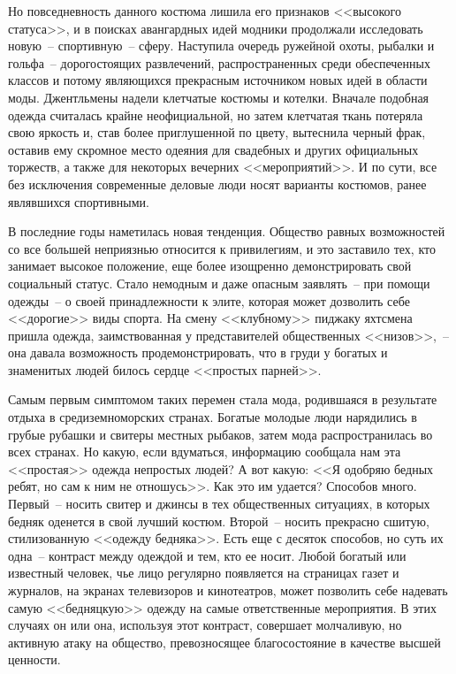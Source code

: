   Но повседневность данного костюма лишила его признаков <<высокого статуса>>,
  и в поисках авангардных идей модники продолжали исследовать новую~--
  спортивную~-- сферу. Наступила очередь ружейной охоты, рыбалки и гольфа~--
  дорогостоящих развлечений, распространенных среди обеспеченных классов и
  потому являющихся прекрасным источником новых идей в области моды.
  Джентльмены надели клетчатые костюмы и котелки. Вначале подобная одежда
  считалась крайне неофициальной, но затем клетчатая ткань потеряла свою
  яркость и, став более приглушенной по цвету, вытеснила черный фрак, оставив
  ему скромное место одеяния для свадебных и других официальных торжеств, а
  также для некоторых вечерних <<мероприятий>>. И по сути, все без исключения
  современные деловые люди носят варианты костюмов, ранее являвшихся
  спортивными.
  
  В последние годы наметилась новая тенденция. Общество равных возможностей со
  все большей неприязнью относится к привилегиям, и это заставило тех, кто
  занимает высокое положение, еще более изощренно демонстрировать свой
  социальный статус. Стало немодным и даже опасным заявлять~-- при помощи
  одежды~-- о своей принадлежности к элите, которая может дозволить себе
  <<дорогие>> виды спорта. На смену <<клубному>> пиджаку яхтсмена пришла
  одежда, заимствованная у представителей общественных <<низов>>,~-- она
  давала возможность продемонстрировать, что в груди у богатых и знаменитых
  людей билось сердце <<простых парней>>.
  
  Самым первым симптомом таких перемен стала мода, родившаяся в результате
  отдыха в средиземноморских странах. Богатые молодые люди нарядились в грубые
  рубашки и свитеры местных рыбаков, затем мода распространилась во всех
  странах. Но какую, если вдуматься, информацию сообщала нам эта <<простая>>
  одежда непростых людей? А вот какую: <<Я одобряю бедных ребят, но сам к ним
  не отношусь>>. Как это им удается? Способов много. Первый~-- носить свитер и
  джинсы в тех общественных ситуациях, в которых бедняк оденется в свой лучший
  костюм. Второй~-- носить прекрасно сшитую, стилизованную <<одежду бедняка>>.
  Есть еще с десяток способов, но суть их одна~-- контраст между одеждой и тем,
  кто ее носит. Любой богатый или известный человек, чье лицо регулярно
  появляется на страницах газет и журналов, на экранах телевизоров и
  кинотеатров, может позволить себе надевать самую <<бедняцкую>> одежду на
  самые ответственные мероприятия. В этих случаях он или она, используя этот
  контраст, совершает молчаливую, но активную атаку на общество, превозносящее
  благосостояние в качестве высшей ценности.

